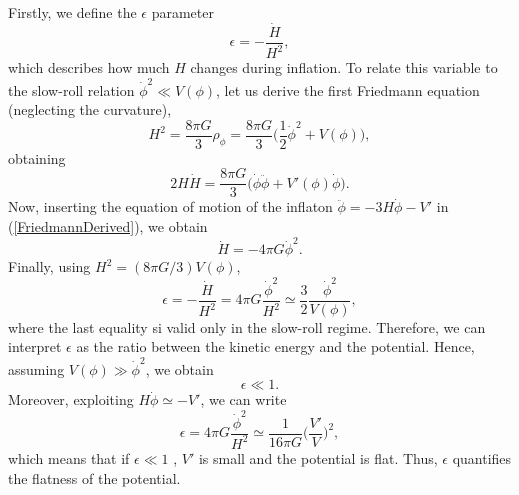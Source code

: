 \documentclass[11pt,a4paper,twoside]{book}
\begin{document}
Firstly, we define the $\epsilon$ parameter
\begin{equation}
	\label{epsilon}
	\epsilon = - \frac{\dot{H}}{H^{2}},
\end{equation}
which describes how much $ H $ changes during inflation.
To relate this variable to the slow-roll relation $ \dot{\phi}^{2} \ll V(\phi) $, let us derive the first Friedmann equation (neglecting the curvature),
\begin{equation}
	\label{derivingEpsilon1}
	H^{2}=\frac{8\pi G}{3}\rho_{\phi} = \frac{8\pi G}{3} \Big (\frac{1}{2}\dot{\phi}^{2} + V(\phi) \Big ),
\end{equation}
obtaining
\begin{equation}
	\label{FriedmannDerived}
	2H\dot{H} = \frac{8\pi G}{3} \Big (\dot{\phi} \ddot{\phi} + V'(\phi)\dot{\phi} \Big ).
\end{equation}
Now, inserting the equation of motion of the inflaton $ \ddot{\phi} = -3H\dot{\phi} - V'  $ in (\ref{FriedmannDerived}), we obtain
\begin{equation}
	\label{Hdot}
	\dot{H} = -4\pi G\dot{\phi}^{2}.
\end{equation}
Finally, using $ H^{2}=(8\pi G/3)V(\phi) $, 
\begin{equation}
	\label{epsilon2}
	\epsilon= - \frac{\dot{H}}{H^{2}}=4\pi G \frac{\dot{\phi}^{2}}{H^{2}} \simeq \frac{3}{2} \frac{\dot{\phi}^{2}}{V(\phi)},
\end{equation}
where the last equality si valid only in the slow-roll regime. Therefore, we can interpret $\epsilon$ as the ratio between the kinetic energy and the potential. 
Hence, assuming $ V(\phi) \gg \dot{\phi}^{2}  $, we obtain 
\begin{equation}
	\label{conditionEpsilon}
	\epsilon \ll 1 .
\end{equation}
Moreover, exploiting $ H\dot{\phi} \simeq -V' $, we can write
\begin{equation}
	\label{newEpsilon}
	\epsilon=4\pi G \frac{\dot{\phi}^{2}}{H^{2}} \simeq \frac{1}{16\pi G} \Big (\frac{V'}{V} \Big )^{2},	
\end{equation}
which means that if $\epsilon \ll 1 $ , $V'$ is small and the potential is flat. Thus, $\epsilon$ quantifies the flatness of the potential.
\end{document}
